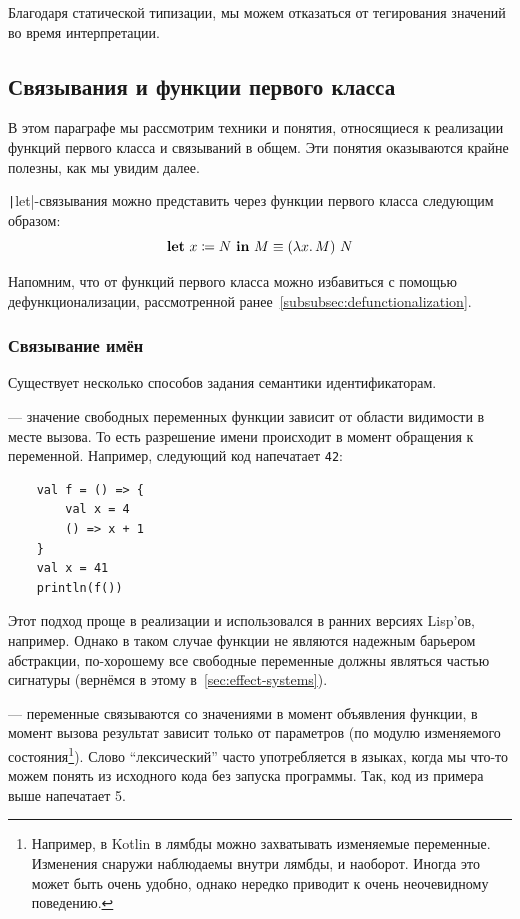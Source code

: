 Благодаря статической типизации, мы можем отказаться от тегирования значений во время интерпретации.

\subsection{Связывания и функции первого класса} \label{subsec:first-class-functions}

В этом параграфе мы рассмотрим техники и понятия, относящиеся к реализации функций первого класса и связываний в общем.
Эти понятия оказываются крайне полезны, как мы увидим далее.

\texttt|let|-связывания можно представить через функции первого класса следующим образом:
\[
    \mathbf{let} ~ x \coloneqq N ~ \mathbf{in} ~ M \equiv (\lambda x\ldotp M) ~ N
\]

Напомним, что от функций первого класса можно избавиться с помощью дефункционализации, рассмотренной ранее~\ref{subsubsec:defunctionalization}.

\subsubsection{Связывание имён} \label{subsubsec:name-bindings}

Существует несколько способов задания семантики идентификаторам.

 --- значение свободных переменных функции зависит от области видимости в месте вызова.
То есть разрешение имени происходит в момент обращения к переменной.
Например, следующий код напечатает \texttt{42}:
\begin{verbatim}
    val f = () => {
        val x = 4
        () => x + 1
    }
    val x = 41
    println(f())
\end{verbatim}

Этот подход проще в реализации и использовался в ранних версиях Lisp'ов, например.
Однако в таком случае функции не являются надежным барьером абстракции, по-хорошему все свободные переменные должны являться частью сигнатуры (вернёмся в этому в~\ref{sec:effect-systems}).

 --- переменные связываются со значениями в момент объявления функции, в момент вызова результат зависит только от параметров (по модулю изменяемого состояния\footnote{Например, в Kotlin в лямбды можно захватывать изменяемые переменные. Изменения снаружи наблюдаемы внутри лямбды, и наоборот. Иногда это может быть очень удобно, однако нередко приводит к очень неочевидному поведению.}).
Слово ``лексический'' часто употребляется в языках, когда мы что-то можем понять из исходного кода без запуска программы.
Так, код из примера выше напечатает 5.

